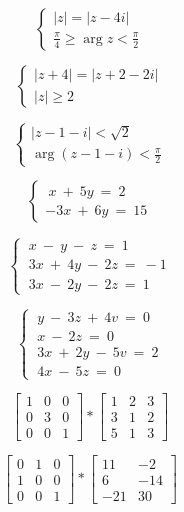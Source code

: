\documentclass[a4paper]{article}
\begin{document}
$$ \begin{cases}
|z| = |z-4i| \\
\frac{\pi}{4} \geq \arg{z} < \frac{\pi}{2} 
\end{cases} $$

$$ \begin{cases}
|z+4| = |z+2-2i| \\
|z| \geq 2
\end{cases} $$

$$ \begin{cases}
|z-1-i| < \sqrt{2} \\
\arg{(z-1-i)} < \frac{\pi}{2} 
\end{cases} $$

$$ \begin{cases}
\ x \ + \ 5y \ = \ 2 \\
-3x \ + \ 6y \ = \ 15
\end{cases} $$

$$ \begin{cases}
\ x \ - \ y \ - \ z \ = \ 1 \\
\ 3x \ + \ 4y \ - \ 2z \ = \ -1 \\
\ 3x \ - \ 2y \ - \ 2z \ = \ 1
\end{cases} $$

$$ \begin{cases}
\ y \ - \ 3z \ + \ 4v \ = \ 0 \\
\ x \ - \ 2z \ = \ 0 \\
\ 3x \ + \ 2y \ - \ 5v \ = \ 2 \\
\ 4x \ - \ 5z \ = \ 0
\end{cases} $$

$$\left[ 
\begin{array}{ccc}
1 & 0 & 0 \\
0 & 3 & 0 \\
0 & 0 & 1
\end{array}
\right]
*
\left[
\begin{array}{ccc} 
1 & 2 & 3 \\
3 & 1 & 2 \\
5 & 1 & 3
\end{array}
\right]
$$

$$\left[ 
\begin{array}{ccc}
0 & 1 & 0 \\
1 & 0 & 0 \\
0 & 0 & 1
\end{array}
\right]
*
\left[
\begin{array}{ccc} 
11 & -2 \\
6 & -14 \\
-21 & 30
\end{array}
\right]
$$
\end{document}
